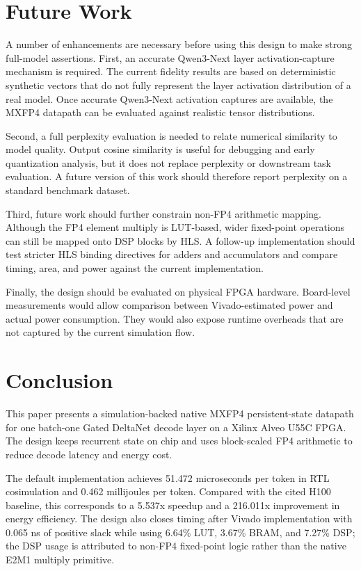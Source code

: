 \documentclass[conference]{IEEEtran}
\begin{document}
\section{Future Work}
A number of enhancements are necessary before using this design to make strong full-model assertions. First, an accurate Qwen3-Next layer activation-capture mechanism is required. The current fidelity results are based on deterministic synthetic vectors that do not fully represent the layer activation distribution of a real model. Once accurate Qwen3-Next activation captures are available, the MXFP4 datapath can be evaluated against realistic tensor distributions.

Second, a full perplexity evaluation is needed to relate numerical similarity to model quality. Output cosine similarity is useful for debugging and early quantization analysis, but it does not replace perplexity or downstream task evaluation. A future version of this work should therefore report perplexity on a standard benchmark dataset.

Third, future work should further constrain non-FP4 arithmetic mapping. Although the FP4 element multiply is LUT-based, wider fixed-point operations can still be mapped onto DSP blocks by HLS. A follow-up implementation should test stricter HLS binding directives for adders and accumulators and compare timing, area, and power against the current implementation.

Finally, the design should be evaluated on physical FPGA hardware. Board-level measurements would allow comparison between Vivado-estimated power and actual power consumption. They would also expose runtime overheads that are not captured by the current simulation flow.

\section{Conclusion}
This paper presents a simulation-backed native MXFP4 persistent-state datapath for one batch-one Gated DeltaNet decode layer on a Xilinx Alveo U55C FPGA. The design keeps recurrent state on chip and uses block-scaled FP4 arithmetic to reduce decode latency and energy cost.

The default implementation achieves 51.472 microseconds per token in RTL cosimulation and 0.462 millijoules per token. Compared with the cited H100 baseline, this corresponds to a 5.537x speedup and a 216.011x improvement in energy efficiency. The design also closes timing after Vivado implementation with 0.065 ns of positive slack while using 6.64\% LUT, 3.67\% BRAM, and 7.27\% DSP; the DSP usage is attributed to non-FP4 fixed-point logic rather than the native E2M1 multiply primitive.
\end{document}
